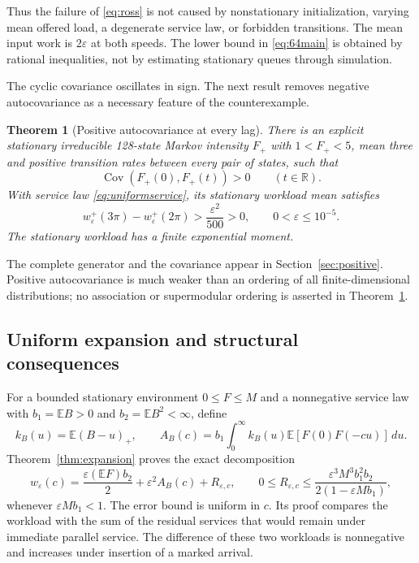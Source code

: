 \documentclass[aap,preprint]{imsart}
\numberwithin{equation}{section}
\theoremstyle{plain}
\newtheorem{theorem}{Theorem}[section]
\theoremstyle{definition}
\newcommand{\E}{\mathbb E}
\newcommand{\R}{\mathbb R}
\newcommand{\1}{\mathbf 1}
\newcommand{\eps}{\varepsilon}
\DeclareMathOperator{\Cov}{Cov}
\begin{document}
Thus the failure of \eqref{eq:ross} is not caused by nonstationary initialization, varying mean offered load, a degenerate service law, or forbidden transitions. The mean input work is $2\eps$ at both speeds. The lower bound in \eqref{eq:64main} is obtained by rational inequalities, not by estimating stationary queues through simulation.

The cyclic covariance oscillates in sign. The next result removes negative autocovariance as a necessary feature of the counterexample.
\begin{theorem}[Positive autocovariance at every lag]\label{thm:positive}
There is an explicit stationary irreducible 128-state Markov intensity $F_+$ with $1<F_+<5$, mean three and positive transition rates between every pair of states, such that
\begin{equation}\label{eq:poscovintro}
 \Cov(F_+(0),F_+(t))>0\qquad(t\in\R).
\end{equation}
With service law \eqref{eq:uniformservice}, its stationary workload mean satisfies
\begin{equation}\label{eq:positivegap}
 w^+_\eps(3\pi)-w^+_\eps(2\pi)>\frac{\eps^2}{500}>0,
 \qquad 0<\eps\le10^{-5}.
\end{equation}
The stationary workload has a finite exponential moment.
\end{theorem}
The complete generator and the covariance appear in Section~\ref{sec:positive}. Positive autocovariance is much weaker than an ordering of all finite-dimensional distributions; no association or supermodular ordering is asserted in Theorem~\ref{thm:positive}.

\subsection{Uniform expansion and structural consequences}
For a bounded stationary environment $0\le F\le M$ and a nonnegative service law with $b_1=\E B>0$ and $b_2=\E B^2<\infty$, define
\begin{equation}\label{eq:kernelintro}
 k_B(u)=\E(B-u)_+,
 \qquad
 A_B(c)=b_1\int_0^\infty k_B(u)\E[F(0)F(-cu)]\,du.
\end{equation}
Theorem~\ref{thm:expansion} proves the exact decomposition
\begin{equation}\label{eq:introexp}
 w_\eps(c)=\frac{\eps(\E F)b_2}{2}+\eps^2A_B(c)+R_{\eps,c},
 \qquad
 0\le R_{\eps,c}\le
 \frac{\eps^3M^3b_1^2b_2}{2(1-\eps Mb_1)},
\end{equation}
whenever $\eps Mb_1<1$. The error bound is uniform in $c$. Its proof compares the workload with the sum of the residual services that would remain under immediate parallel service. The difference of these two workloads is nonnegative and increases under insertion of a marked arrival.
\end{document}
